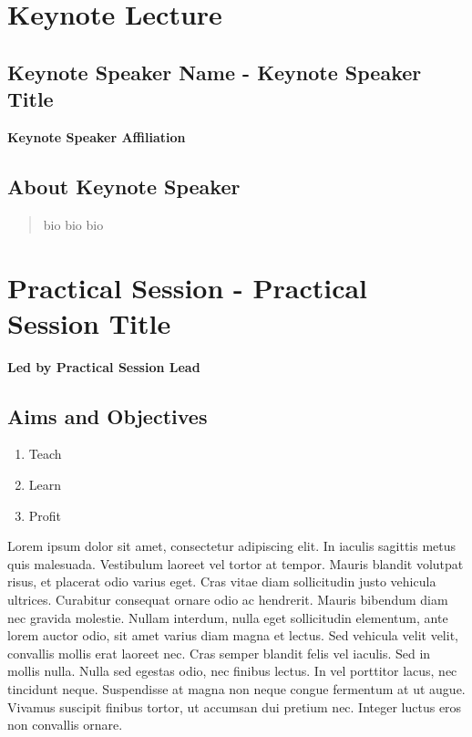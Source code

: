 \documentclass[12pt,]{book}
\providecommand{\tightlist}{%
  \setlength{\itemsep}{0pt}\setlength{\parskip}{0pt}}
\begin{document}
\section*{Keynote Lecture}\label{keynote-lecture-5}

\subsection*{Keynote Speaker Name - Keynote Speaker
Title}\label{keynote-speaker-name---keynote-speaker-title-1}

\textbf{Keynote Speaker Affiliation}

\subsection*{About Keynote Speaker}\label{about-keynote-speaker-1}

\begin{quote}
bio bio bio
\end{quote}

\section*{Practical Session - Practical Session
Title}\label{practical-session---practical-session-title-1}

\textbf{Led by Practical Session Lead}

\subsection*{Aims and Objectives}\label{aims-and-objectives-5}

\begin{enumerate}
\def\labelenumi{\arabic{enumi}.}
\tightlist
\item
  Teach
\item
  Learn
\item
  Profit
\end{enumerate}

Lorem ipsum dolor sit amet, consectetur adipiscing elit. In iaculis
sagittis metus quis malesuada. Vestibulum laoreet vel tortor at tempor.
Mauris blandit volutpat risus, et placerat odio varius eget. Cras vitae
diam sollicitudin justo vehicula ultrices. Curabitur consequat ornare
odio ac hendrerit. Mauris bibendum diam nec gravida molestie. Nullam
interdum, nulla eget sollicitudin elementum, ante lorem auctor odio, sit
amet varius diam magna et lectus. Sed vehicula velit velit, convallis
mollis erat laoreet nec. Cras semper blandit felis vel iaculis. Sed in
mollis nulla. Nulla sed egestas odio, nec finibus lectus. In vel
porttitor lacus, nec tincidunt neque. Suspendisse at magna non neque
congue fermentum at ut augue. Vivamus suscipit finibus tortor, ut
accumsan dui pretium nec. Integer luctus eros non convallis ornare.
\end{document}

